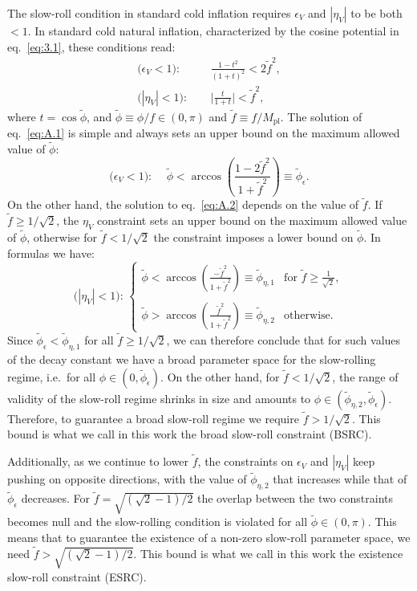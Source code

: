 \documentclass[a4paper,11pt]{article}
\begin{document}
The slow-roll condition in standard cold inflation requires $\epsilon_V$ and $|\eta_V|$ to be both $<1$. In standard cold natural inflation, characterized by the cosine potential in eq.~\eqref{eq:3.1}, these conditions read:
\begin{align}
\text{($\epsilon_{V}<1$): }& \quad  \frac{1-t^2}{(1+t)^{2}}<2\tilde{f}^2, \label{eq:A.1} \\
\text{($|\eta_{V}|<1$): }& \quad \Big|\frac{t}{1+t}\Big|<\tilde{f}^2, \label{eq:A.2}
\end{align}
where $t=\cos\tilde{\phi}$, and $\tilde{\phi}\equiv \phi/f\in(0,\pi)$ and $\tilde{f}\equiv f/M_{\mathrm{pl}}$. The solution of eq.~\eqref{eq:A.1} is simple and always sets an upper bound on the maximum allowed value of $\tilde{\phi}$:
\begin{equation}
 \text{($\epsilon_{V}<1$): } \quad   \tilde{\phi}<\arccos{\left(\frac{1-2\tilde{f}^2}{1+\tilde{f}^2}\right)}\equiv \tilde{\phi}_\epsilon.
\end{equation}
On the other hand, the solution to eq.~\eqref{eq:A.2} depends on the value of $\tilde{f}$. If $\tilde{f}\geq 1/\sqrt{2}$, the $\eta_V$ constraint sets an upper bound on the maximum allowed value of $\tilde{\phi}$, otherwise for $\tilde{f}< 1/\sqrt{2}$ the constraint imposes a lower bound on $\tilde{\phi}$. In formulas we have:
\begin{equation}
    \text{($|\eta_{V}|<1$): } \begin{cases}
  \tilde{\phi}<\arccos{\left(\frac{-\tilde{f}^2}{1+\tilde{f}^2}\right)}\equiv \tilde{\phi}_{\eta,1} & \text{for } \tilde{f}\geq\frac{1}{\sqrt{2}}, \\   
  \\
  \tilde{\phi}>\arccos{\left(\frac{\tilde{f}^2}{1+\tilde{f}^2}\right)}\equiv \tilde{\phi}_{\eta,2} & \text{otherwise.}    
\end{cases}
\end{equation}
Since $\tilde{\phi}_\epsilon<\tilde{\phi}_{\eta,1}$ for all $\tilde{f}\geq 1/\sqrt{2}$, we can therefore conclude that for such values of the decay constant we have a broad parameter space for the slow-rolling regime, i.e.\ for all $\phi\in(0,\tilde{\phi}_\epsilon)$. On the other hand, for $\tilde{f}<1/\sqrt{2}$, the range of validity of the slow-roll regime shrinks in size and amounts to $\phi\in(\tilde{\phi}_{\eta,2},\tilde{\phi}_\epsilon)$. Therefore, to guarantee a broad slow-roll regime we require $\tilde{f}>1/\sqrt{2}$. This bound is what we call in this work the broad slow-roll constraint (BSRC).

Additionally, as we continue to lower $\tilde{f}$, the constraints on $\epsilon_V$ and $|\eta_V|$ keep pushing on opposite directions, with the value of $\tilde{\phi}_{\eta,2}$ that increases while that of $\tilde{\phi}_{\epsilon}$ decreases. For $\tilde{f}=\sqrt{(\sqrt{2}-1)/2}$ the overlap between the two constraints becomes null and the slow-rolling condition is violated for all $\tilde{\phi}\in(0,\pi)$. This means that to guarantee the existence of a non-zero slow-roll parameter space, we need $\tilde{f}>\sqrt{(\sqrt{2}-1)/2}$. This bound is what we call in this work the existence slow-roll constraint (ESRC). 



\end{document}
